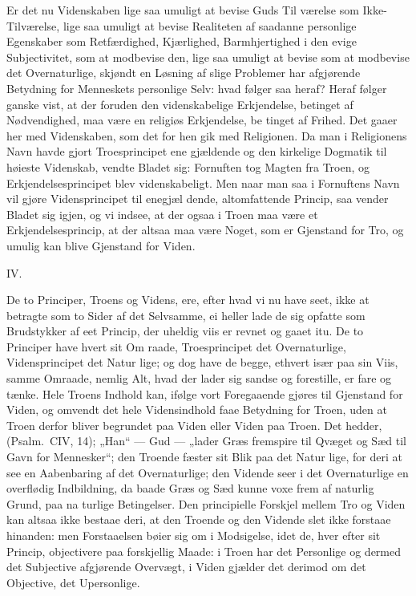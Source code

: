 \documentclass[12pt,a4paper]{article}
\newcommand{\opage}[1]{\marginnote{\footnotesize\textit{[#1]}}}
\begin{document}
Er det nu Videnskaben lige saa umuligt at bevise Guds Til\-%
værelse som Ikke-Tilværelse, lige saa umuligt at bevise Realiteten
af saadanne personlige Egenskaber som Retfærdighed, Kjærlighed,
Barmhjertighed i den evige Subjectivitet, som at modbevise den,
lige saa umuligt at bevise som at modbevise det Overnaturlige,
skjøndt en Løsning af slige Problemer har afgjørende Betydning
for Menneskets personlige Selv: hvad følger saa heraf? Heraf
følger ganske vist, at der foruden den videnskabelige Erkjendelse,
betinget af Nødvendighed, maa være en religiøs Erkjendelse, be\-%
tinget af Frihed. Det gaaer her med Videnskaben, som det for\-%
hen gik med Religionen. Da man i Religionens Navn havde
gjort Troesprincipet ene gjældende og den kirkelige Dogmatik til
høieste Videnskab, vendte Bladet sig: Fornuften tog Magten fra
Troen, og Erkjendelsesprincipet blev videnskabeligt. Men naar
man saa i Fornuftens Navn vil gjøre Vidensprincipet til enegjæl\-%
dende, altomfattende Princip, saa vender Bladet sig igjen, og vi
indsee, at der ogsaa i Troen maa være et Erkjendelsesprincip, at
der altsaa maa være Noget, som er Gjenstand for Tro, og umulig
kan blive Gjenstand for Viden.

\begin{center}IV.\end{center}

De to Principer, Troens og Videns, ere, efter hvad vi nu have
seet, ikke at betragte som to Sider af det Selvsamme, ei heller
\opage{44}lade de sig opfatte som Brudstykker af eet Princip, der uheldig\-%
viis er revnet og gaaet itu. De to Principer have hvert sit Om\-%
raade, Troesprincipet det Overnaturlige, Vidensprincipet det Natur\-%
lige; og dog have de begge, ethvert især paa sin Viis, samme
Omraade, nemlig Alt, hvad der lader sig sandse og forestille, er\-%
fare og tænke. Hele Troens Indhold kan, ifølge vort Foregaaende
gjøres til Gjenstand for Viden, og omvendt det hele Vidensindhold
faae Betydning for Troen, uden at Troen derfor bliver begrundet
paa Viden eller Viden paa Troen. Det hedder, (Psalm.\ CIV, 14);
„Han“ --- Gud --- „lader Græs fremspire til Qvæget og Sæd til
Gavn for Mennesker“; den Troende fæster sit Blik paa det Natur\-%
lige, for deri at see en Aabenbaring af det Overnaturlige; den
Vidende seer i det Overnaturlige en overflødig Indbildning, da
baade Græs og Sæd kunne voxe frem af naturlig Grund, paa na\-%
turlige Betingelser. Den principielle Forskjel mellem Tro og Viden
kan altsaa ikke bestaae deri, at den Troende og den Vidende slet
ikke forstaae hinanden: men Forstaaelsen bøier sig om i Modsigelse,
idet de, hver efter sit Princip, objectivere paa forskjellig Maade:
i Troen har det Personlige og dermed det Subjective afgjørende
Overvægt, i Viden gjælder det derimod om det Objective, det
Upersonlige.
\end{document}
